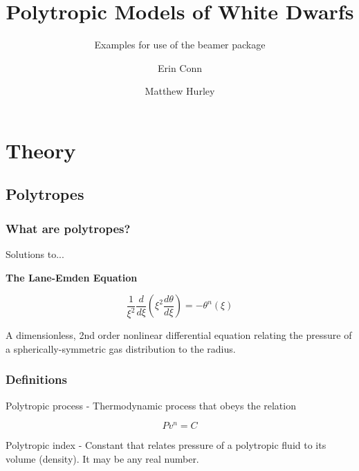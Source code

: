 \documentclass{beamer}
\title[Polytropes] %
{Polytropic Models of White Dwarfs}
\subtitle{Examples for use of the beamer package}
\author[Conn, Hurley] %
{Erin Conn \and Matthew Hurley}
\begin{document}
    \frame{\titlepage}

    \section{Theory}

        \subsection{Polytropes}

        \begin{frame}
            \frametitle{What are polytropes?}

            Solutions to...

            \textbf{The Lane-Emden Equation}

            \begin{equation}
                \frac{1}{\xi^2}\frac{d}{d\xi}\left(\xi^2\frac{d\theta}{d\xi}\right)=-\theta^n(\xi)
            \end{equation} 

            A dimensionless, 2nd order nonlinear differential equation relating the
            pressure of a spherically-symmetric gas distribution to the radius.

        \end{frame}

        \begin{frame}
            \frametitle{Definitions}

            \begin{definition}
                \alert{Polytropic process} - Thermodynamic process that obeys the relation
                
                \[Pv^n=C\]
            \end{definition} 

            \begin{definition}
                \alert{Polytropic index} - Constant that relates pressure of a polytropic fluid to its volume (density). It may be any real number.
            \end{definition}

        \end{frame}
\end{document}
